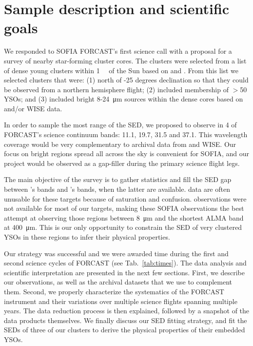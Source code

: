 \section{Sample description and scientific goals}


We responded to SOFIA FORCAST's first science call with a proposal for a survey of nearby star-forming cluster cores. The clusters were selected from a list of dense young clusters within \SI{1}{\kilo\pc} of the Sun based on \citet{Porras:2003kxa} and \citet{Gutermuth:2009gca}. From this list we selected clusters that were: (1) north of -25 degrees declination so that they could be observed from a northern hemisphere flight; (2) included membership of $>$50 YSOs; and (3) included bright 8-\SI{24}{\micro\meter} sources within the dense cores based on \Spitzer and/or WISE data. 

In order to sample the most range of the SED, we proposed to observe in 4 of FORCAST's science continuum bands: 11.1, 19.7, 31.5 and \SI{37.1}{\micron}. This wavelength coverage would be very complementary to archival data from \Spitzer and WISE. Our focus on bright regions spread all across the sky is convenient for SOFIA, and our project would be observed as a gap-filler during the primary science flight legs.

The main objective of the survey is to gather statistics and fill the SED gap between {\Spitzer}'s bands and {\Herschel}'s bands, when the latter are available. \Spitzer data are often unusable for these targets because of saturation and confusion. \Herschel observations were not available for most of our targets, making these SOFIA observations the best attempt at observing those regions between \SI{8}{\um} and the shortest ALMA band at \SI{400}{\um}. This is our only opportunity to constrain the SED of very clustered YSOs in these regions to infer their physical properties.



Our strategy was successful and we were awarded time during the first and second science cycles of FORCAST (see Tab.~\ref{tab:times}). The data analysis and scientific interpretation are presented in the next few sections. First, we describe our observations, as well as the archival datasets that we use to complement them. Second, we properly characterize the systematics of the FORCAST instrument and their variations over multiple science flights spanning multiple years. The data reduction process is then explained, followed by a snapshot of the data products themselves. We finally discuss our SED fitting strategy, and fit the SEDs of three of our clusters to derive the physical properties of their embedded YSOs.


